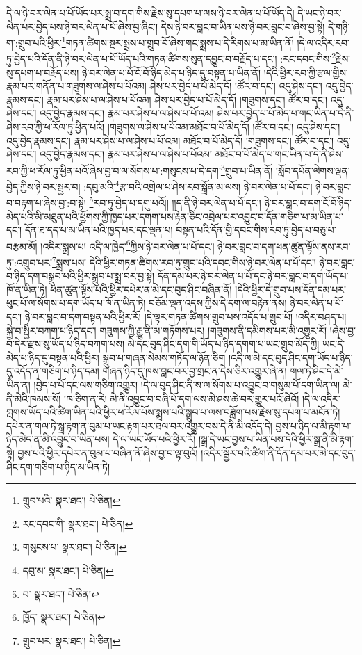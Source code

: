 དེ་ལ་ཉེ་བར་ལེན་པ་པོ་ཡོད་པར་སྨྲ་བ་དག་གིས་རྗེས་སུ་དཔག་པ་ལས་ཉེ་བར་ལེན་པ་པོ་ཡོད་དེ། དེ་ཡང་ཉེ་བར་ལེན་པར་བྱེད་པས་ཉེ་བར་ལེན་པ་པོ་ཞེས་བྱ་ཞིང་། དེས་ཉེ་བར་བླང་བ་ཡིན་པས་ཉེ་བར་བླང་བ་ཞེས་བྱ་སྟེ། དེ་གཉི་ག་:གྲུབ་པའི་ཕྱིར་\footnote{གྲུབ་པའི་  སྣར་ཐང་།  པེ་ཅིན། }གཏན་ཚིགས་སྔར་སྨྲས་པ་གྲུབ་བོ་ཞེས་གང་སྨྲས་པ་དེ་རིགས་པ་མ་ཡིན་ནོ། །དེ་ལ་འདིར་རབ་ཏུ་བྱེད་པའི་དོན་ནི་ཉེ་བར་ལེན་པ་པོ་ཡོད་པའི་གཏན་ཚིགས་སུན་དབྱུང་བ་བརྗོད་པ་དང་། :རང་དབང་གིས་\footnote{རང་དབང་གི་  སྣར་ཐང་།  པེ་ཅིན། }རྗེས་སུ་དཔག་པ་བརྗོད་པས། ཉེ་བར་ལེན་པ་པོ་ངོ་བོ་ཉིད་མེད་པ་ཉིད་དུ་བསྟན་པ་ཡིན་ནོ། །དེའི་ཕྱིར་རབ་ཀྱི་རྩལ་གྱིས་རྣམ་པར་གནོན་པ་གཟུགས་ལ་ཤེས་པ་པོའམ། ཤེས་པར་བྱེད་པ་པོ་མེད་དོ། །ཚོར་བ་དང་། འདུ་ཤེས་དང་། འདུ་བྱེད་རྣམས་དང་། རྣམ་པར་ཤེས་པ་ལ་ཤེས་པ་པོའམ། ཤེས་པར་བྱེད་པ་པོ་མེད་དོ། །གཟུགས་དང་། ཚོར་བ་དང་། འདུ་ཤེས་དང་། འདུ་བྱེད་རྣམས་དང་། རྣམ་པར་ཤེས་པ་ལ་ཤེས་པ་པོ་འམ། ཤེས་པར་བྱེད་པ་པོ་མེད་པ་གང་ཡིན་པ་དེ་ནི་ཤེས་རབ་ཀྱི་ཕ་རོལ་ཏུ་ཕྱིན་པའོ། །གཟུགས་ལ་ཤེས་པ་པོའམ་མཐོང་བ་པོ་མེད་དོ། །ཚོར་བ་དང་། འདུ་ཤེས་དང་། འདུ་བྱེད་རྣམས་དང་། རྣམ་པར་ཤེས་པ་ལ་ཤེས་པ་པོ་འམ། མཐོང་བ་པོ་མེད་དོ། །གཟུགས་དང་། ཚོར་བ་དང་། འདུ་ཤེས་དང་། འདུ་བྱེད་རྣམས་དང་། རྣམ་པར་ཤེས་པ་ལ་ཤེས་པ་པོའམ། མཐོང་བ་པོ་མེད་པ་གང་ཡིན་པ་དེ་ནི་ཤེས་རབ་ཀྱི་ཕ་རོལ་ཏུ་ཕྱིན་པའོ་ཞེས་བྱ་བ་ལ་སོགས་པ་:གསུངས་པ་དེ་དག་\footnote{གསུངས་པ་  སྣར་ཐང་།  པེ་ཅིན། }གྲུབ་པ་ཡིན་ནོ། །སློབ་དཔོན་ལེགས་ལྡན་བྱེད་ཀྱིས་ཉེ་བར་སྦྱར་བ། :དབུ་མའི་\footnote{དབུ་མ་  སྣར་ཐང་།  པེ་ཅིན། }རྩ་བའི་འགྲེལ་པ་ཤེས་རབ་སྒྲོན་མ་ལས། ཉེ་བར་ལེན་པ་པོ་དང་། ཉེ་བར་བླང་བ་བརྟག་པ་ཞེས་བྱ་:བ་སྟེ། \footnote{བ་  སྣར་ཐང་།  པེ་ཅིན། }རབ་ཏུ་བྱེད་པ་དགུ་པའོ།། །།ད་ནི་ཉེ་བར་ལེན་པ་པོ་དང་། ཉེ་བར་བླང་བ་དག་ངོ་བོ་ཉིད་མེད་པའི་མི་མཐུན་པའི་ཕྱོགས་ཀྱི་ཁྱད་པར་དགག་པས་རྟེན་ཅིང་འབྲེལ་པར་འབྱུང་བ་དོན་གཅིག་པ་མ་ཡིན་པ་དང་། དོན་ཐ་དད་པ་མ་ཡིན་པའི་ཁྱད་པར་དང་ལྡན་པ། བསྟན་པའི་དོན་གྱི་དབང་གིས་རབ་ཏུ་བྱེད་པ་བཅུ་པ་བརྩམ་མོ། །འདིར་སྨྲས་པ། འདི་ལ་ཁྱེད་\footnote{ཁྱོད་  སྣར་ཐང་།  པེ་ཅིན། }ཀྱིས་ཉེ་བར་ལེན་པ་པོ་དང་། ཉེ་བར་བླང་བ་དག་ཕན་ཚུན་ལྟོས་ནས་རབ་ཏུ་:འགྲུབ་པར་\footnote{གྲུབ་པར་  སྣར་ཐང་།  པེ་ཅིན། }སྨྲས་པས། དེའི་ཕྱིར་གཏན་ཚིགས་རབ་ཏུ་གྲུབ་པའི་དབང་གིས་ཉེ་བར་ལེན་པ་པོ་དང་། ཉེ་བར་བླང་བ་ཉིད་དག་བསྒྲུབ་པའི་ཕྱིར་སྒྲུབ་པ་སྨྲ་བར་བྱ་སྟེ། དོན་དམ་པར་ཉེ་བར་ལེན་པ་པོ་དང་ཉེ་བར་བླང་བ་དག་ཡོད་པ་ཁོ་ན་ཡིན་ཏེ། ཕན་ཚུན་ལྟོས་པའི་ཕྱིར་དཔེར་ན་མེ་དང་བུད་ཤིང་བཞིན་ནོ། །དེའི་ཕྱིར་དེ་གྲུབ་པས་དོན་དམ་པར་ཕུང་པོ་ལ་སོགས་པ་དག་ཡོད་པ་ཁོ་ན་ཡིན་ཏེ། བཅོམ་ལྡན་འདས་ཀྱིས་དེ་དག་ལ་བརྟེན་ནས། ཉེ་བར་ལེན་པ་པོ་དང་། ཉེ་བར་བླང་བ་དག་བསྟན་པའི་ཕྱིར་རོ། །དེ་ལྟར་གཏན་ཚིགས་གྲུབ་པས་འདོད་པ་གྲུབ་པོ། །འདིར་བཤད་པ། སྐྱེ་བ་སྤྱིར་བཀག་པ་ཉིད་དང་། གཟུགས་ཀྱི་རྒྱུ་ནི་མ་གཏོགས་པར། །གཟུགས་ནི་དམིགས་པར་མི་འགྱུར་རོ། །ཞེས་བྱ་བ་དེར་རྫས་སུ་ཡོད་པ་ཉིད་བཀག་པས། མེ་དང་བུད་ཤིང་དག་གི་ཡོད་པ་ཉིད་དགག་པ་ཡང་གྲུབ་མོད་ཀྱི། ཡང་དེ་མེད་པ་ཉིད་དུ་བསྟན་པའི་ཕྱིར། སྒྲུབ་པ་གཞན་སེམས་གཏོད་ལ་ཉོན་ཅིག །འདི་ལ་མེ་དང་བུད་ཤིང་དག་ཡོད་པ་ཉིད་དུ་འདོད་ན་གཅིག་པ་ཉིད་དམ། གཞན་ཉིད་དུ་ཁས་བླང་བར་བྱ་གྲང་ན་དེས་ཅིར་འགྱུར་ཞེ་ན། གལ་ཏེ་ཤིང་དེ་མེ་ཡིན་ན། །བྱེད་པ་པོ་དང་ལས་གཅིག་འགྱུར། །དེ་ལ་བུད་ཤིང་ནི་ས་ལ་སོགས་པ་འབྱུང་བ་གསུམ་པོ་དག་ཡིན་ལ། མེ་ནི་མེའི་ཁམས་སོ། །ཁ་ཅིག་ན་རེ། མེ་ནི་འབྱུང་བ་བཞི་པོ་དག་ལས་མེ་ཤས་ཆེ་བར་གྱུར་པའོ་ཞེའོ། །དེ་ལ་འདིར་གླགས་ཡོད་པའི་ཚིག་ཡིན་པའི་ཕྱིར་ཕ་རོལ་པོས་སྨྲས་པའི་སྒྲུབ་པ་ལས་བཟློག་པས་རྗེས་སུ་དཔག་པ་མངོན་ཏེ། དཔེར་ན་གལ་ཏེ་སྒྲ་རྟག་ན་བུམ་པ་ཡང་རྟག་པར་ཐལ་བར་འགྱུར་བས་དེ་ནི་མི་འདོད་དེ། བྱས་པ་ཉིད་ལ་མི་རྟག་པ་ཉིད་མེད་ན་མི་འབྱུང་བ་ཡིན་པས། དེ་ལ་ཡང་ཡོད་པའི་ཕྱིར་རོ། །སྒྲ་དེ་ཡང་བྱས་པ་ཡིན་པས་དེའི་ཕྱིར་སྒྲ་ནི་མི་རྟག་སྟེ། བྱས་པའི་ཕྱིར་དཔེར་ན་བུམ་པ་བཞིན་ནོ་ཞེས་བྱ་བ་ལྟ་བུའོ། །འདིར་སྦྱོར་བའི་ཚིག་ནི་དོན་དམ་པར་མེ་དང་བུད་ཤིང་དག་གཅིག་པ་ཉིད་མ་ཡིན་ཏེ། 